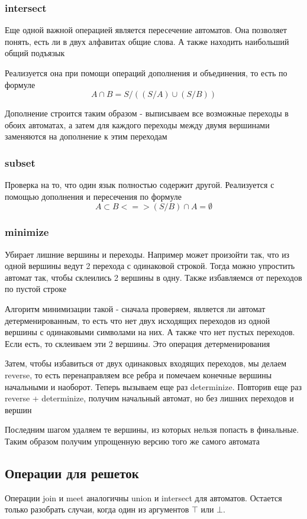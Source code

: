 \subsubsection*{intersect}
Еще одной важной операцией является пересечение автоматов. Она позволяет понять, есть ли в двух алфавитах общие слова. А также находить наибольший общий подъязык

Реализуется она при помощи операций дополнения и объединения, то есть по формуле \[A \cap B = S / ((S / A) \cup (S / B))\]

Дополнение строится таким образом - выписываем все возможные переходы в обоих автоматах, а затем для каждого переходы между двумя вершинами заменяются на дополнение к этим переходам

\subsubsection*{subset}
Проверка на то, что один язык полностью содержит другой. Реализуется с помощью дополнения и пересечения по формуле
\[A \subset B <=> (S / B) \cap A = \emptyset\]

\subsubsection*{minimize}
Убирает лишние вершины и переходы. Например может произойти так, что из одной вершины ведут 2 перехода с одинаковой строкой. Тогда можно упростить автомат так, чтобы склеились 2 вершины в одну. Также избавляемся от переходов по пустой строке

Алгоритм минимизации такой - сначала проверяем, является ли автомат детерменированным, то есть что нет двух исходящих переходов из одной вершины с одинаковыми символами на них. А также что нет пустых переходов. Если есть, то склеиваем эти 2 вершины. Это операция детерменирования

Затем, чтобы избавиться от двух одинаковых входящих переходов, мы делаем reverse, то есть перенаправляем все ребра и помечаем конечные вершины начальными и наоборот. Теперь вызываем еще раз determinize. Повторив еще раз reverse + determinize, получим начальный автомат, но без лишних переходов и вершин

Последним шагом удаляем те вершины, из которых нельзя попасть в финальные. Таким образом получим упрощенную версию того же самого автомата

\newpage
\subsection{Операции для решеток}
Операции join и meet аналогичны union и intersect для автоматов. Остается только разобрать случаи, когда один из аргументов $\top$ или $\bot$. 

